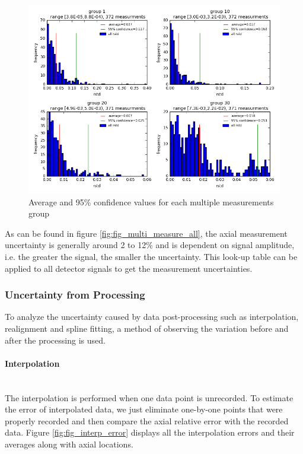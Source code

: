 \documentclass{article}
\begin{document}
\begin{figure}[ht]
\centering
\includegraphics[keepaspectratio, width = 4.5 in]{figures/flux_map_uncertainties/multi_measure_groups.png}
\caption{Average and 95\% confidence values for each multiple measurements group}
\label{fig:fig_measure_groups}
\end{figure}

As can be found in figure \ref{fig:fig_multi_measure_all}, the axial measurement uncertainty is generally around 2 to 12\% and is dependent on signal amplitude, i.e. the greater the signal, the smaller the uncertainty. This look-up table can be applied to all detector signals to get the measurement uncertainties.


\subsubsection{Uncertainty from Processing}
To analyze the uncertainty caused by data post-processing such as interpolation, realignment and spline fitting, a method of observing the variation before and after the processing is used.

\paragraph{Interpolation}
\mbox{ }\\
The interpolation is performed when one data point is unrecorded. To estimate the error of interpolated data, we just eliminate one-by-one points that were properly recorded and then compare the axial relative error with the recorded data. Figure \ref{fig:fig_interp_error} displays all the interpolation errors and their averages along with axial locations.
\end{document}
